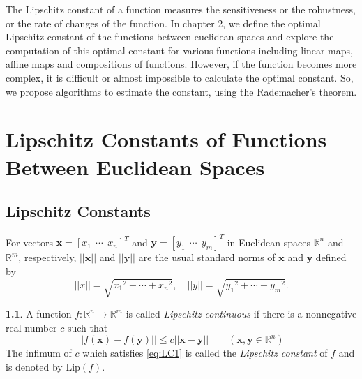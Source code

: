 \documentclass[12pt]{report}
\numberwithin{figure}{chapter}
\theoremstyle{plain}
\theoremstyle{definition}
\newtheorem{definition}[theorem]{\protect\definitionname}
\theoremstyle{corollary}
\theoremstyle{definition}
\theoremstyle{plain}
\theoremstyle{definition}
\theoremstyle{plain}
\providecommand{\definitionname}{Definition}
\newcommand\bx{\ensuremath{\boldsymbol x}}
\newcommand\by{\ensuremath{\boldsymbol y}}
\newcommand\lip{\ensuremath{\text{Lip}}}
\begin{document}
The Lipschitz constant of a function measures the sensitiveness or the robustness, or the rate of changes of the function.
In chapter 2, we define the optimal Lipschitz constant of the functions between euclidean spaces and explore the computation of this optimal constant for various functions including linear maps, affine maps and compositions of functions.
However, if the function becomes more complex, it is difficult or almost impossible to calculate the optimal constant.
So, we propose algorithms to estimate the constant, using the Rademacher's theorem.

\chapter{Lipschitz Constants of Functions Between Euclidean Spaces}

\section{Lipschitz Constants}
For vectors \(\bx=[x_1\:\:\cdots\:\:x_n]^T\) and \(\by=[y_1\:\:\cdots\:\:y_m]^T\) in Euclidean spaces \(\mathbb R^n\) and \(\mathbb R^m\), respectively, \(||\bx||\) and \(||\by||\) are the usual standard norms of \bx{} and \by{} defined by
\begin{equation}\label{eq:euclidean_norm}
||x||=\sqrt{{x_1}^2+\cdots+{x_n}^2},\quad ||y||=\sqrt{{y_1}^2+\cdots+{y_m}^2}.
\end{equation}

\begin{definition}\label{LC}
A function \(f:\mathbb R^n\to\mathbb R^m\) is called \emph{Lipschitz continuous} if there is a nonnegative real number \(c\) such that
\begin{equation}\label{eq:LC1}
||f(\bx)-f(\by)||\le c||\bx-\by||\qquad(\bx,\by\in\mathbb R^n)
\end{equation}
The infimum of \(c\) which satisfies \eqref{eq:LC1} is called the \emph{Lipschitz constant} of \(f\) and is denoted by \(\lip(f)\).
\end{definition}
\end{document}
